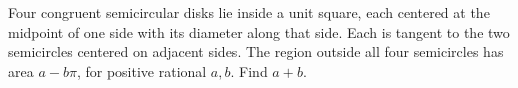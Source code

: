 Four congruent semicircular disks lie inside a unit square, each centered at the midpoint of one side with its diameter along that side. Each is tangent to the two semicircles centered on adjacent sides. The region outside all four semicircles has area $a-b\pi$, for positive rational $a,b$. Find $a+b$.
